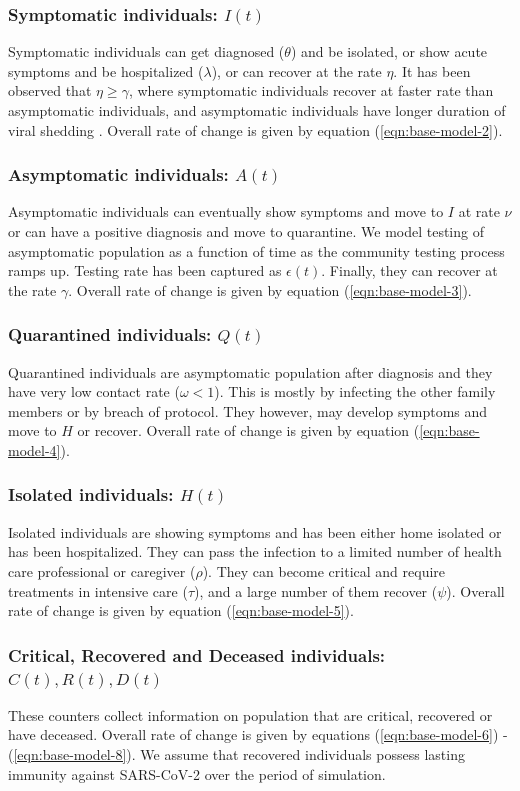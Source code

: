 \documentclass[authoryear,preprint]{elsarticle}
\begin{document}
\subsubsection{Symptomatic individuals: $I(t)$}
Symptomatic individuals can get diagnosed ($\theta$) and be isolated, or show acute symptoms and be hospitalized ($\lambda$), or can recover at the rate $\eta$. It has been observed that $\eta \geq \gamma$, where symptomatic individuals recover at faster rate than asymptomatic individuals, and asymptomatic individuals have longer duration of viral shedding \cite{Long2020}. Overall rate of change is given by equation (\ref{eqn:base-model-2}).

\subsubsection{Asymptomatic individuals: $A(t)$}
 Asymptomatic individuals can eventually show symptoms and move to $I$ at rate $\nu$ or can have a positive diagnosis and move to quarantine. We model testing of asymptomatic population as a function of time as the community testing process ramps up. Testing rate has been captured as $\epsilon(t)$. Finally, they can recover at the rate $\gamma$. Overall rate of change is given by equation (\ref{eqn:base-model-3}).

\subsubsection{Quarantined individuals: $Q(t)$}
Quarantined individuals are asymptomatic population after diagnosis and they have very low contact rate ($\omega < 1$). This is mostly by infecting the other family members or by breach of protocol. They however, may develop symptoms and move to $H$ or recover. Overall rate of change is given by equation (\ref{eqn:base-model-4}).

\subsubsection{Isolated individuals: $H(t)$}
Isolated individuals are showing symptoms and has been either home isolated or has been hospitalized. They can pass the infection to a limited number of health care professional or caregiver ($\rho$). They can become critical and require treatments in intensive care ($\tau$), and a large number of them recover ($\psi$). Overall rate of change is given by equation (\ref{eqn:base-model-5}).

\subsubsection{Critical, Recovered and Deceased individuals: $C(t), R(t), D(t)$}
These counters collect information on population that are critical, recovered or have deceased. Overall rate of change is given by equations (\ref{eqn:base-model-6}) -  (\ref{eqn:base-model-8}). We assume that recovered individuals possess lasting immunity against SARS-CoV-2 over the period of simulation.
\end{document}

